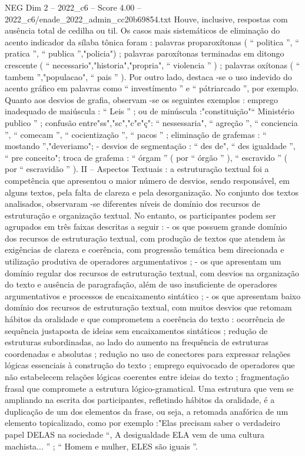 \begin{textsample}{NEG Dim 2 – 2022\_c6 – Score 4.00 – 2022\_c6/enade\_2022\_admin\_cc20b69854.txt}
Houve, inclusive, respostas com ausência total de cedilha ou til.
Os casos mais sistemáticos de eliminação do acento indicador da sílaba tônica foram : palavras proparoxítonas ( “ politica ”, “ pratica ”, “ publica ”,"policia") ; palavras paroxítonas terminadas em ditongo crescente ( “ necessario","historia","propria", “ violencia ” ) ; palavras oxítonas ( “ tambem ”,"populacao", “ pais ” ).
Por outro lado, destaca -se o uso indevido do acento gráfico em palavras como “ investímento ” e “ pátriarcado ”, por exemplo.
Quanto aos desvios de grafia, observam -se os seguintes exemplos : emprego inadequado de maiúscula : “ Leis ” ; ou de minúscula :"constituição"“ Ministério publico ” ; confusão entre"ss","sc","c"e"ç": “ nessessaria", “ agreção ”, “ conciencia ”, “ comecam ”, “ cocientização ”, “ pacos ” ; eliminação de grafemas : “ mostando ”,"deveriamo"; - desvios de segmentação : “ des de", “ des igualdade ”, “ pre conceito"; troca de grafema : “ órgam ” ( por “ órgão ” ), “ escravido ” ( por “ escravidão ” ).
II – Aspectos Textuais : a estruturação textual foi a competência que apresentou o maior número de desvios, sendo responsável, em alguns textos, pela falta de clareza e pela desorganização.
No conjunto dos textos analisados, observaram -se diferentes níveis de domínio dos recursos de estruturação e organização textual.
No entanto, os participantes podem ser agrupados em três faixas descritas a seguir : - os que possuem grande domínio dos recursos de estruturação textual, com produção de textos que atendem às exigências de clareza e coerência, com progressão temática bem direcionada e utilização produtiva de operadores argumentativos ; - os que apresentam um domínio regular dos recursos de estruturação textual, com desvios na organização do texto e ausência de paragrafação, além de uso insuficiente de operadores argumentativos e processos de encaixamento sintático ; - os que apresentam baixo domínio dos recursos de estruturação textual, com muitos desvios que retomam hábitos da oralidade e que comprometem a coerência do texto : ocorrência de sequência justaposta de ideias sem encaixamentos sintáticos ; redução de estruturas subordinadas, ao lado do aumento na frequência de estruturas coordenadas e absolutas ; redução no uso de conectores para expressar relações lógicas essenciais à construção do texto ; emprego equivocado de operadores que não estabelecem relações lógicas coerentes entre ideias do texto ; fragmentação frasal que compromete a estrutura lógico-gramatical.
Uma estrutura que vem se ampliando na escrita dos participantes, refletindo hábitos da oralidade, é a duplicação de um dos elementos da frase, ou seja, a retomada anafórica de um elemento topicalizado, como por exemplo :"Elas precisam saber o verdadeiro papel DELAS na sociedade “, A desigualdade ELA vem de uma cultura machista... ” ; “ Homem e mulher, ELES são iguais ”.

\end{textsample}
